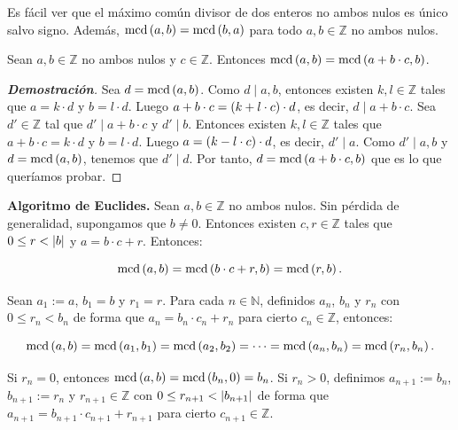 \begin{observation}
  \rm Es fácil ver que el máximo común divisor de dos enteros no ambos nulos es único salvo signo. Además, $\text{mcd}\left(a,b\right)=\text{mcd}\left(b,a\right)$ para todo $a,b\in\mathbb{Z}$ no ambos nulos.
\end{observation}

\begin{proposition}
  \rm Sean $a,b\in\mathbb{Z}$ no ambos nulos y $c\in\mathbb{Z}$. Entonces $\text{mcd}\left(a,b\right)=\text{mcd}\left(a+b\cdot c,b\right)$.
  \begin{proof}[\rm\textbf{Demostración}]
    Sea $d=\text{mcd}\left(a,b\right)$. Como $d\mid a,b$, entonces existen $k,l\in\mathbb{Z}$ tales que $a=k\cdot d$ y $b=l\cdot d$. Luego $a+b\cdot c=\left(k+l\cdot c\right)\cdot d$, es decir, $d\mid a+b\cdot c$. Sea $d'\in\mathbb{Z}$ tal que $d'\mid a+b\cdot c$ y $d'\mid b$. Entonces existen $k,l\in\mathbb{Z}$ tales que $a+b\cdot c=k\cdot d$ y $b=l\cdot d$. Luego $a=\left(k-l\cdot c\right)\cdot d$, es decir, $d'\mid a$. Como $d'\mid a,b$ y $d=\text{mcd}\left(a,b\right)$, tenemos que $d'\mid d$. Por tanto, $d=\text{mcd}\left(a+b\cdot c,b\right)$ que es lo que queríamos probar.
  \end{proof}
\end{proposition}

\textbf{Algoritmo de Euclides.} Sean $a,b\in\mathbb{Z}$ no ambos nulos. Sin pérdida de generalidad, supongamos que $b\neq 0$. Entonces existen $c,r\in\mathbb{Z}$ tales que $0\leq r<\left|b\right|$ y $a=b\cdot c+r$. Entonces:

\begin{equation}
  \text{mcd}\left(a,b\right)=\text{mcd}\left(b\cdot c+r,b\right)=\text{mcd}\left(r,b\right).
\end{equation}

Sean $a_1:=a$, $b_1=b$ y $r_1=r$. Para cada $n\in\mathbb{N}$, definidos $a_n$, $b_n$ y $r_n$ con $0\leq r_n<b_n$ de forma que $a_n=b_n\cdot c_n+r_n$ para cierto $c_n\in\mathbb{Z}$, entonces:

\begin{equation}
  \text{mcd}\left(a,b\right)=\text{mcd}\left(a_1,b_1\right)=\text{mcd}\left(a_2,b_2\right)=\cdots=\text{mcd}\left(a_n,b_n\right)=\text{mcd}\left(r_n,b_n\right).
\end{equation}

Si $r_n=0$, entonces $\text{mcd}\left(a,b\right)=\text{mcd}\left(b_n,0\right)=b_n$. Si $r_n>0$, definimos $a_{n+1}:=b_n$, $b_{n+1}:=r_n$ y $r_{n+1}\in\mathbb{Z}$ con $0\leq r_{n+1}<\left|b_{n+1}\right|$ de forma que $a_{n+1}=b_{n+1}\cdot c_{n+1}+r_{n+1}$ para cierto $c_{n+1}\in\mathbb{Z}$.

